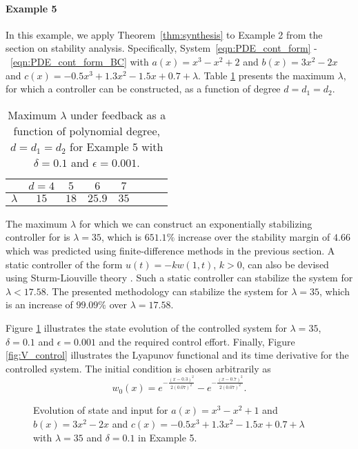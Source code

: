 \documentclass[9pt,journal,twocolumn]{IEEEtran}
\begin{document}
\paragraph*{Example 5} In this example, we apply Theorem~\ref{thm:synthesis} to Example 2 from the section on stability analysis. Specifically, System~\eqref{eqn:PDE_cont_form} -~\eqref{eqn:PDE_cont_form_BC} with $a(x)=x^3-x^2+2$ and $b(x)=3x^2-2x$ and $c(x)= -0.5x^3 + 1.3x^2 - 1.5x + 0.7+\lambda$. Table \ref{table_synthesis_1} presents the maximum  $\lambda$, for which a controller can be constructed, as a function of degree $d=d_1=d_2$.
\begin{table}[h]
\begin{center}
    \begin{tabular}{l *{7}{c}}\hline \hline
  & $d=4$ & $5$ & $6$ & $7$ \\ \hline
$\lambda$ &  $15$ & $18$ & $25.9$ & $35$ \\
\end{tabular}
\end{center}
\caption{Maximum $\lambda$ under feedback as a function of polynomial degree, $d=d_1=d_2$ for Example 5 with $\delta=0.1$ and $\epsilon=0.001$.}
\label{table_synthesis_1}
\end{table}The maximum $\lambda$ for which we can construct an exponentially stabilizing controller for is $\lambda=35$, which is $651.1 \%$ increase over the stability margin of $4.66$ which was predicted using finite-difference methods in the previous section. A static controller of the form $u(t)=-kw(1,t)$, $k > 0$, can also be devised using Sturm-Liouville theory \cite[Chapter~5]{egorov1996spectral}. Such a static controller can stabilize the system for $\lambda < 17.58$. The presented methodology can stabilize the system for $\lambda=35$, which is an increase of $99.09 \%$ over $\lambda=17.58$. 


Figure \ref{fig:control_control} illustrates the state evolution of the controlled system for $\lambda=35$, $\delta=0.1$ and $\epsilon=0.001$ and the required control effort. Finally, Figure \ref{fig:V_control} illustrates the Lyapunov functional and its time derivative for the controlled system. The initial condition is chosen arbitrarily as 
\begin{equation}\label{eqn:initial}
w_0(x)=e^{-\frac{(x-0.3)^2}{2 (0.07)^2}}-e^{-\frac{(x-0.7)^2}{2 (0.07)^2}}.
\end{equation}

\begin{figure}[h!]
\centering
{}
\quad
{}
\caption{Evolution of state and input for $a(x)=x^3-x^2+1$ and $b(x)=3x^2-2x$ and $c(x)= -0.5x^3 + 1.3x^2 - 1.5x + 0.7+\lambda$ with $\lambda=35$ and $\delta=0.1$ in Example 5.}
\label{fig:control_control}
\end{figure}
\end{document}
